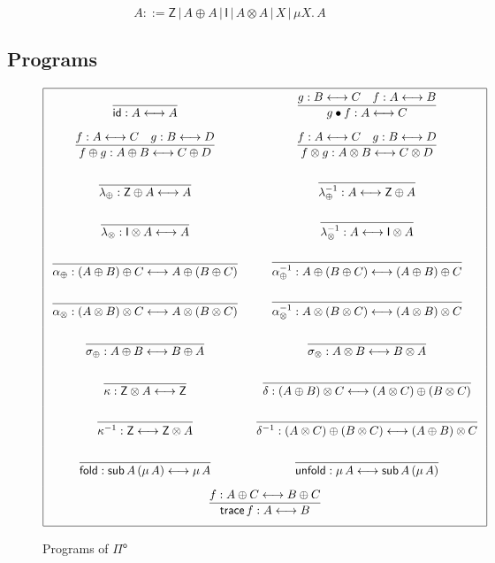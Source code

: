\documentclass[runningheads]{llncs}
\newcommand{\Pio}{$\mathsf{\Pi}^{\mathsf{o}}$}
\newcommand{\Ty}{\mathsf{Ty}}
\newcommand{\Var}{\mathsf{Var}}
\newcommand{\id}{\mathsf{id}}
\newcommand{\lr}{\longleftrightarrow}
\newcommand{\fold}{\mathsf{fold}}
\newcommand{\unfold}{\mathsf{unfold}}
\newcommand{\sub}{\mathsf{sub}}
\newcommand{\trace}{\mathsf{trace}}
\newcommand{\Z}{\mathsf{Z}}
\newcommand{\I}{\mathsf{I}}
\begin{document}
\[
A ::= \Z \, | \,A \oplus A \, | \,\I \,| \,A \otimes A \,| \,X \,|
\,\mu X.\,A 
\]


\subsection{Programs}

\begin{figure}
\[
\arraycolsep=8pt\def\arraystretch{2.8}
\begin{array}{|cc|}
\hline
\infer{\id : A \lr A}{}
& \infer{g \bullet f : A \lr C}{g : B \lr C & f : A \lr B} \\
\infer{f \oplus g : A \oplus B \lr C \oplus D}{f : A \lr C & g : B \lr D} 
& \infer{f \otimes g : A \otimes B \lr C \otimes D}{f : A \lr C & g : B \lr D} \\
\infer{\lambda_{\oplus} : \Z \oplus A \lr A}{}
& \infer{\lambda_{\oplus}^{-1} : A \lr \Z \oplus A}{} \\
\infer{\lambda_{\otimes} : \I \otimes A \lr A}{}
& \infer{\lambda_{\otimes}^{-1} : A \lr \I \otimes A}{} \\
\infer{\alpha_{\oplus} : (A \oplus B) \oplus C \lr A \oplus (B \oplus C)}{}
& \infer{\alpha_{\oplus}^{-1} : A \oplus (B \oplus C) \lr (A \oplus B) \oplus C}{} \\
\infer{\alpha_{\otimes} : (A \otimes B) \otimes C \lr A \otimes (B \otimes C)}{}
& \infer{\alpha_{\otimes}^{-1} : A \otimes (B \otimes C) \lr (A \otimes B) \otimes C}{} \\
\infer{\sigma_{\oplus} : A \oplus B \lr B \oplus A}{}
& \infer{\sigma_{\otimes} : A \otimes B \lr B \otimes A}{} \\
\infer{\kappa : \Z \otimes A \lr \Z}{} 
& \infer{\delta : (A \oplus B) \otimes C \lr (A \otimes C) \oplus (B \otimes C)}{} \\
\infer{\kappa^{-1} : \Z \lr \Z \otimes A}{}
& \infer{\delta^{-1} : (A \otimes C) \oplus (B \otimes C)  \lr (A \oplus B) \otimes C}{} \\
\infer{\fold : \sub \, A \, (\mu \,A) \lr \mu \,A}{} 
& \infer{\unfold : \mu\,A \lr \sub \, A \, (\mu \,A)}{} \\
\multicolumn{2}{|c|}{\infer{\trace \,f: A \lr B}{f : A \oplus C \lr B \oplus C}} \\
\hline
\end{array}
\]
\caption{Programs of \Pio}
\label{fig:programs}
\end{figure}
\end{document}
